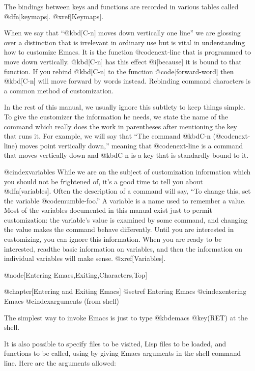 {{  The bindings between keys and functions are recorded in various tables
called @dfn[keymaps].  @xref[Keymaps].

  When we say that ``@kbd[C-n] moves down vertically one line'' we are
glossing over a distinction that is irrelevant in ordinary use but is vital
in understanding how to customize Emacs.  It is the function
@code{next-line} that is programmed to move down vertically.  @kbd[C-n] has
this effect @i[because] it is bound to that function.  If you rebind
@kbd[C-n] to the function @code[forward-word] then @kbd[C-n] will move
forward by words instead.  Rebinding command characters is a common
method of customization.

  In the rest of this manual, we usually ignore this subtlety to keep
things simple.  To give the customizer the information he needs, we
state the name of the command which really does the work in parentheses
after mentioning the key that runs it.  For example, we will say that
``The command @kbd{C-n} (@code{next-line}) moves point vertically down,''
meaning that @code{next-line} is a command that moves vertically down
and @kbd{C-n} is a key that is standardly bound to it.

@cindex{variables}
  While we are on the subject of customization information which you should
not be frightened of, it's a good time to tell you about @dfn[variables].
Often the description of a command will say, ``To change this, set the
variable @code{mumble-foo}.''  A variable is a name used to remember a
value.  Most of the variables documented in this manual exist just to
permit customization: the variable's value is examined by some command,
and changing the value makes the command behave differently.  Until you
are interested in customizing,  you can ignore this information.  When you
are ready to be interested, readthe basic information on variables, and
then the information on individual variables will make sense.
@xref[Variables].

@node[Entering Emacs,Exiting,Characters,Top]

@chapter[Entering and Exiting Emacs]
@setref Entering Emacs
@cindex{entering Emacs}
@cindex{arguments (from shell)}

  The simplest way to invoke Emacs is just to type @kbd{emacs
@key(RET)} at the shell.

  It is also possible to specify files to be visited, Lisp files to be
loaded, and functions to be called, using by giving Emacs arguments in
the shell command line.  Here are the arguments allowed:

}}
